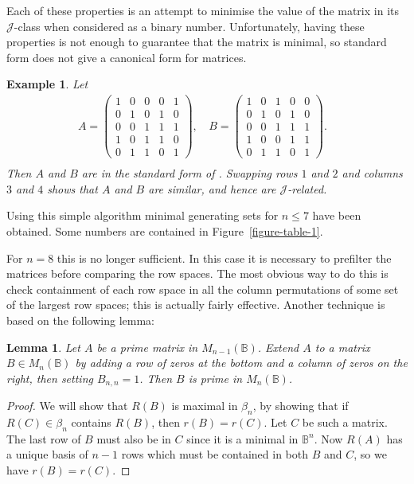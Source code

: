 \documentclass[11pt]{article}
\newtheorem{lemma}[thm]{Lemma}
\newtheorem{ex}[thm]{Example}
\numberwithin{equation}{section}
\newcommand{\B}{\mathbb{B}}
\newcommand{\Bn}{M_n(\B)}
\newcommand{\J}{\mathscr{J}}
\begin{document}
Each of these properties is an attempt to minimise the value of the matrix in its $\J$-class when considered as a binary number.
Unfortunately, having these properties is not enough to guarantee that the matrix is minimal, so standard form does not give a canonical form for matrices.

\begin{ex}
Let
\begin{align*}
  A = \begin{pmatrix}
    1 & 0 & 0 & 0 & 1 \\
    0 & 1 & 0 & 1 & 0 \\
    0 & 0 & 1 & 1 & 1 \\
    1 & 0 & 1 & 1 & 0 \\
    0 & 1 & 1 & 0 & 1 
  \end{pmatrix}\text{, }&
  B = \begin{pmatrix}
    1 & 0 & 1 & 0 & 0 \\
    0 & 1 & 0 & 1 & 0 \\
    0 & 0 & 1 & 1 & 1 \\
    1 & 0 & 0 & 1 & 1 \\
    0 & 1 & 1 & 0 & 1 
  \end{pmatrix}.&\\
\end{align*}
Then $A$ and $B$ are in the standard form of
. Swapping rows $1$ and $2$ and columns $3$
and $4$ shows that $A$ and $B$ are similar, and hence are $\J$-related.
\end{ex}

Using this simple algorithm minimal generating sets for $n \leq 7$ have been obtained.
Some numbers are contained in Figure~\ref{figure-table-1}.

For $n=8$ this is no longer sufficient. In this case it is necessary to
prefilter the matrices before comparing the row spaces. The most obvious way
to do this is check containment of each row space in all the column permutations
of some set of the largest row spaces; this is actually fairly effective.
Another technique is based on the following lemma:

\begin{lemma}
  Let $A$ be a prime matrix in $M_{n-1}(\B)$. Extend $A$ to a matrix $B \in \Bn$
  by adding a row of zeros at the bottom and a column of zeros on the right,
  then setting $B_{n,n} = 1$. Then $B$ is prime in $\Bn$.
\end{lemma}
\begin{proof}
  We will show that $R(B)$ is maximal in $\beta_n$, by showing that if 
  $R(C) \in \beta_n$ contains $R(B)$, then $r(B) = r(C)$.
  Let $C$ be such a matrix.
  The last row of $B$ must also be in $C$ since it is a minimal in $\B^{n}$. 
  Now $R(A)$ has a unique basis of $n-1$ rows which must be contained in both $B$ and
  $C$, so we have $r(B) = r(C)$.
\end{proof}
\end{document}
